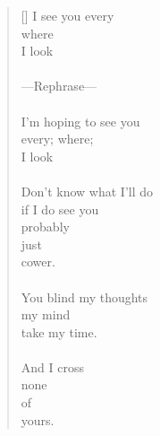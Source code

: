 \documentclass{article}
\begin{document}
\newpage
{}
\settowidth{\versewidth}{Than Tycho Brahe, or Erra Pater:}
\begin{verse}[\versewidth]
I see you every \\
\tab where \\
\tab \tab I look \\
\\
––Rephrase–– \\
\\
I'm hoping to see you \\
\tab every; where; \\
\tab \tab I look \\
\\
Don't know what I'll do \\
\tab if I do see you \\
\tab \tab probably \\
\tab \tab just \\
\tab \tab cower. \\
\\
You blind my thoughts \\
\tab my mind \\
\tab take my time. \\
\\
And I cross \\
\tab none \\
\tab \tab of \\
\tab \tab \tab yours. \\
\end{verse}
\end{document}
